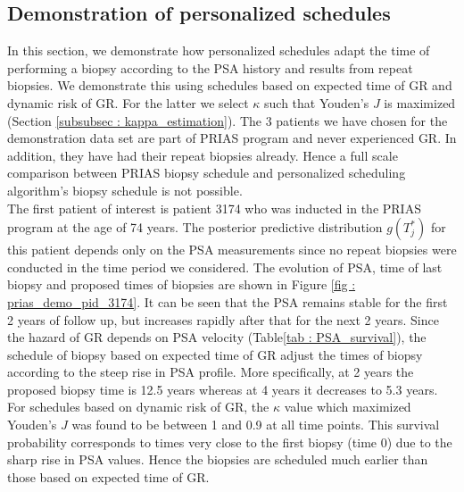 \subsection{Demonstration of personalized schedules}
\label{subsec : demo_prias_pers_schedule}
In this section, we demonstrate how personalized schedules adapt the time of performing a biopsy according to the PSA history and results from repeat biopsies. We demonstrate this using schedules based on expected time of GR and dynamic risk of GR. For the latter we select $\kappa$ such that Youden's $J$ is maximized (Section \ref{subsubsec : kappa_estimation}). The 3 patients we have chosen for the demonstration data set are part of PRIAS program and never experienced GR. In addition, they have had their repeat biopsies already. Hence a full scale comparison between PRIAS biopsy schedule and personalized scheduling algorithm's biopsy schedule is not possible.\\

The first patient of interest is patient 3174 who was inducted in the PRIAS program at the age of 74 years. The posterior predictive distribution $g(T^*_j)$ for this patient depends only on the PSA measurements since no repeat biopsies were conducted in the time period we considered. The evolution of PSA, time of last biopsy and proposed times of biopsies are shown in Figure \ref{fig : prias_demo_pid_3174}. It can be seen that the PSA remains stable for the first 2 years of follow up, but increases rapidly after that for the next 2 years. Since the hazard of GR depends on PSA velocity (Table\ref{tab : PSA_survival}), the schedule of biopsy based on expected time of GR adjust the times of biopsy according to the steep rise in PSA profile. More specifically, at 2 years the proposed biopsy time is 12.5 years whereas at 4 years it decreases to 5.3 years. For schedules based on dynamic risk of GR, the $\kappa$ value which maximized Youden's $J$ was found to be between 1 and 0.9 at all time points. This survival probability corresponds to times very close to the first biopsy (time 0) due to the sharp rise in PSA values. Hence the biopsies are scheduled much earlier than those based on expected time of GR.\\

